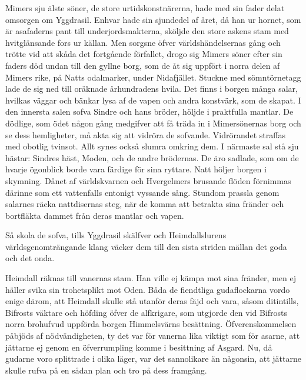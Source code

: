 Mimers sju älste söner, de store urtidskonstnärerna, hade med sin fader
delat omsorgen om Yggdrasil. Enhvar hade sin sjundedel af året, då han
ur hornet, som är asafaderns pant till underjordsmakterna, sköljde den
store askens stam med hvitglänsande fors ur källan. Men sorgsne öfver
världshändelsernas gång och trötte vid att skåda det fortgående
förfallet, drogo sig Mimers söner efter sin faders död undan till den
gyllne borg, som de åt sig uppfört i norra delen af Mimers rike, på
Natts odalmarker, under Nidafjället. Stuckne med sömntörnetagg lade de
sig ned till oräknade århundradens hvila. Det finns i borgen många
salar, hvilkas väggar och bänkar lysa af de vapen och andra konstvärk,
som de skapat. I den innersta salen sofva Sindre och hans bröder, höljde
i praktfulla mantlar. De dödlige, som ödet någon gång medgifver att få
träda in i Mimersönernas borg och se dess hemligheter, må akta sig att
vidröra de sofvande. Vidrörandet straffas med obotlig tvinsot. Allt
synes också slumra omkring dem. I närmaste sal stå sju hästar: Sindres
häst, Moden, och de andre brödernas. De äro sadlade, som om de hvarje
ögonblick borde vara färdige för sina ryttare. Natt höljer borgen i
skymning. Dånet af världskvarnen och Hvergelmers brusande flöden
förnimmas därinne som ett vattenfalls entonigt vyssande sång. Stundom
prassla genom salarnes räcka nattdisernas steg, när de komma att
betrakta sina fränder och bortfläkta dammet från deras mantlar och
vapen.

Så skola de sofva, tills Yggdrasil skälfver och Heimdallslurens
världsgenomträngande klang väcker dem till den sista striden mällan det
goda och det onda.

Heimdall räknas till vanernas stam. Han ville ej kämpa mot sina fränder,
men ej häller svika sin trohetsplikt mot Oden. Båda de fiendtliga
gudaflockarna vordo enige därom, att Heimdall skulle stå utanför deras
fäjd och vara, såsom ditintills, Bifrosts väktare och höfding öfver de
alfkrigare, som utgjorde den vid Bifrosts norra brohufvud uppförda
borgen Himmelsvärns besättning. Öfverenskommelsen påbjöds af
nödvändigheten, ty det var för vanerna lika viktigt som för asarne, att
jättarne ej genom en öfverrumpling komme i besittning af Asgard. Nu, då
gudarne voro splittrade i olika läger, var det sannolikare än någonsin,
att jättarne skulle rufva på en sådan plan och tro på dess framgång.

